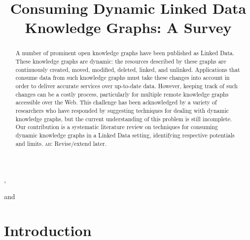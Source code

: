 \documentclass[sw]{iosart2x}
\newcommand{\ah}[1]{{\color{blue!70!black}\textsc{ah:} #1}}
\begin{document}
\begin{frontmatter}

\title{Consuming Dynamic Linked Data Knowledge Graphs: A Survey}

\author[A]{ },
\author[B]{ }
and
\author[A]{ }
\address[A]{IMFD Chile; Department of Computer Science, , }
\address[B]{,
Southampton, }

\begin{abstract}
A number of prominent open knowledge graphs have been published as Linked Data. These knowledge graphs are dynamic: the resources described by these graphs are continuously created, moved, modified, deleted, linked, and unlinked. Applications that consume data from such knowledge graphs must take these changes into account in order to deliver accurate services over up-to-date data. However, keeping track of such changes can be a costly process, particularly for multiple remote knowledge graphs accessible over the Web. This challenge has been acknowledged by a variety of researchers who have responded by suggesting techniques for dealing with dynamic knowledge graphs, but the current understanding of this problem is still incomplete. Our contribution is a systematic literature review on techniques for consuming dynamic knowledge graphs in a Linked Data setting, identifying respective potentials and limits. \ah{Revise/extend later.}
\end{abstract}

\begin{keyword}
\end{keyword}

\end{frontmatter}


\section{Introduction}\label{Introduction}
\end{document}
